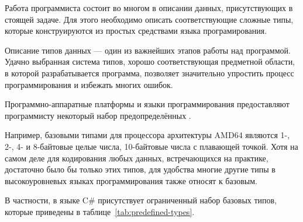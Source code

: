Работа программиста состоит во многом в описании данных,
присутствующих в стоящей задаче. Для этого необходимо описать
соответствующие сложные типы, которые конструируются из простых
средствами языка програмирования.

Описание типов данных — один из важнейших этапов работы над
программой. Удачно выбранная система типов, хорошо соответствующая
предметной области, в которой разрабатывается программа, позволяет
значительно упростить процесс программирования и избежать многих
ошибок.


Программно-аппаратные платформы и языки программирования предоставляют
программисту некоторый набор предопределённых .

Например, базовыми типами для процессора архитектуры AMD64 являются
1-, 2-, 4- и 8-байтовые целые числа, 10-байтовые числа с плавающей
точкой. Хотя на самом деле для кодирования любых данных, встречающихся
на практике, достаточно было бы только этих типов, для удобства многие
другие типы в высокоуровневых языках программирования также относят к
базовым.

В частности, в языке C\# присутствует ограниченный набор базовых
типов, которые приведены в таблице~\ref{tab:predefined-types}.

